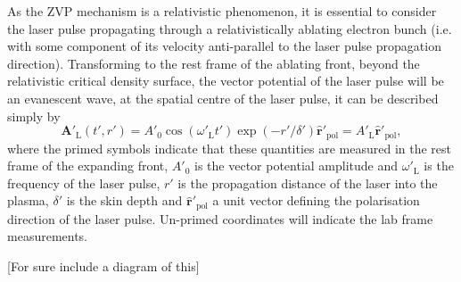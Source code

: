 As the \ac{ZVP} mechanism is a relativistic phenomenon, it is essential to consider the laser pulse propagating through a relativistically ablating electron bunch (i.e. with some component of its velocity anti-parallel to the laser pulse propagation direction). Transforming to the rest frame of the ablating front, beyond the relativistic critical density surface, the vector potential of the laser pulse will be an evanescent wave, at the spatial centre of the laser pulse, it can be described simply by
\begin{equation}
	\mathbf{A}'_\mathrm{L}(t',r') = A'_0\cos(\omega'_\mathrm{L}t')\exp(-r'/\delta')\hat{\mathbf{r}}'_\mathrm{pol}= A'_\mathrm{L}\hat{\mathbf{r}}'_\mathrm{pol},
\end{equation}
where the primed symbols indicate that these quantities are measured in the rest frame of the expanding front, $A'_0$ is the vector potential amplitude and $\omega'_\mathrm{L}$ is the frequency of the laser pulse, $r'$ is the propagation distance of the laser into the plasma, $\delta'$ is the skin depth and $\hat{\mathbf{r}}'_\mathrm{pol}$ a unit vector defining the polarisation direction of the laser pulse. Un-primed coordinates will indicate the lab frame measurements.

[For sure include a diagram of this]


